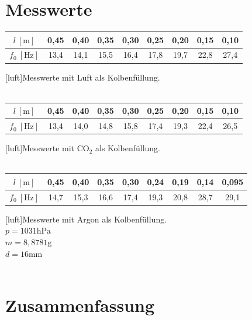 \documentclass[12pt,a4paper,]{scrreprt}
\begin{document}
	\chapter{Messwerte}
    	\begin{center}
    	\begin{tabular}{c|cccccccc}
        	$l ~ [ \text{m}]$ & 0,45 & 0,40  & 0,35 & 0,30 & 0,25 & 0,20 & 0,15 & 0,10 \\ \hline
			$f_0 ~[ \text{Hz}]$& 13,4 & 14,1 & 15,5 & 16,4 & 17,8 & 19,7 & 22,8 & 27,4                
		\end{tabular}
			[luft]{Messwerte mit Luft als Kolbenfüllung.}
            \ \\
            \ \\
    	\begin{tabular}{c|cccccccc}
        	$l ~ [ \text{m}]$ &0,45 & 0,40 & 0,35 & 0,30  & 0,25 & 0,20  & 0,15 & 0,10  \\ \hline
			$f_0 ~[ \text{Hz}]$&13,4 & 14,0  & 14,8 & 15,8 & 17,4 & 19,3 & 22,4 & 26,5
		\end{tabular}
			[luft]{Messwerte mit CO$_2$ als Kolbenfüllung.}
            \ \\
            \ \\
		\begin{tabular}{c|cccccccc}
        	$l ~ [ \text{m}]$ &0,45&0,40& 0,35& 0,30 &0,24 & 0,19 & 0,14 & 0,095 \\ \hline
			$f_0 ~[ \text{Hz}]$&14,7	&15,3&16,6&17,4&19,3	&20,8&28,7&29,1  
		\end{tabular}
			[luft]{Messwerte mit Argon als Kolbenfüllung.}
            \ \\
            $p = 1031 \si{\hecto\pascal}$ \\
            $m = 8,8781 \si{\gram}$ \\
            $d = 16 \si{\milli\metre}$ \\
            
            \ \\
    \end{center}
        
    \pagebreak

	

	
		
        
	\chapter{Zusammenfassung}
    
\end{document}
